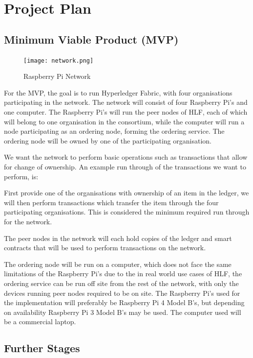 \chapter{Project Plan}\label{ch:style}

\section{Minimum Viable Product (MVP)}

    \begin{figure}
        \texttt{[image: network.png]} 
        \caption{Raspberry Pi Network}
        \label{fig:wrapfig}
    \end{figure}
    
    For the MVP, the goal is to run Hyperledger Fabric, with four organisations participating in the network. The network will consist of four Raspberry Pi's and one computer. The Raspberry Pi's will run the peer nodes of HLF, each of which will belong to one organisation in the consortium, while the computer will run a node participating as an ordering node, forming the ordering service. The ordering node will be owned by one of the participating organisation.
    
    We want the network to perform basic operations such as transactions that allow for change of ownership. An example run through of the transactions we want to perform, is: 
    
    
    First provide one of the organisations with ownership of an item in the ledger, we will then perform transactions which transfer the item through the four participating organisations. This is considered the minimum required run through for the network.
    
    The peer nodes in the network will each hold copies of the ledger and smart contracts that will be used to perform transactions on the network. 
    
    The ordering node will be run on a computer, which does not face the same limitations of the Raspberry Pi's due to the in real world use cases of HLF, the ordering service can be run off site from the rest of the network, with only the devices running peer nodes required to be on site. The Raspberry Pi's used for the implementation will preferably be Raspberry Pi 4 Model B's, but depending on availability Raspberry Pi 3 Model B's may be used. The computer used will be a commercial laptop.
    
\section{Further Stages}

